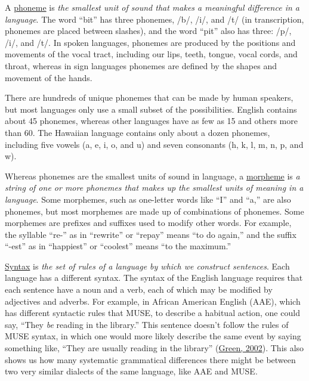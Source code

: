 \documentclass[
]{krantz}
\begin{document}
A \protect\hyperlink{phoneme}{phoneme} is \emph{the smallest unit of sound that makes a meaningful difference in a language}. The word ``bit'' has three phonemes, /b/, /i/, and /t/ (in transcription, phonemes are placed between slashes), and the word ``pit'' also has three: /p/, /i/, and /t/. In spoken languages, phonemes are produced by the positions and movements of the vocal tract, including our lips, teeth, tongue, vocal cords, and throat, whereas in sign languages phonemes are defined by the shapes and movement of the hands.

There are hundreds of unique phonemes that can be made by human speakers, but most languages only use a small subset of the possibilities. English contains about 45 phonemes, whereas other languages have as few as 15 and others more than 60. The Hawaiian language contains only about a dozen phonemes, including five vowels (a, e, i, o, and u) and seven consonants (h, k, l, m, n, p, and w).

Whereas phonemes are the smallest units of sound in language, a \protect\hyperlink{morpheme}{morpheme} is \emph{a string of one or more phonemes that makes up the smallest units of meaning in a language}. Some morphemes, such as one-letter words like ``I'' and ``a,'' are also phonemes, but most morphemes are made up of combinations of phonemes. Some morphemes are prefixes and suffixes used to modify other words. For example, the syllable ``re-'' as in ``rewrite'' or ``repay'' means ``to do again,'' and the suffix ``-est'' as in ``happiest'' or ``coolest'' means ``to the maximum.''

\protect\hyperlink{syntax}{Syntax} is \emph{the set of rules of a language by which we construct sentences}. Each language has a different syntax. The syntax of the English language requires that each sentence have a noun and a verb, each of which may be modified by adjectives and adverbs. For example, in African American English (AAE), which has different syntactic rules that MUSE, to describe a habitual action, one could say, ``They \emph{be} reading in the library.'' This sentence doesn't follow the rules of MUSE syntax, in which one would more likely describe the same event by saying something like, ``They are usually reading in the library'' (\protect\hyperlink{ref-green2002}{Green, 2002}). This also shows us how many systematic grammatical differences there might be between two very similar dialects of the same language, like AAE and MUSE.
\end{document}
